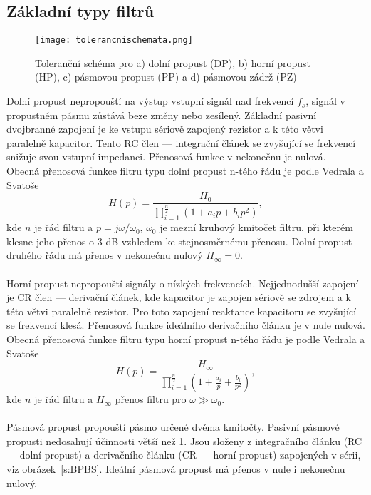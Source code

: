 \subsection{Základní typy filtrů}
\begin{figure}[h]
\centering
\texttt{[image: tolerancnischemata.png]}
\caption[Toleranční schéma dolní propusti (DP), horní propusti (HP), pásmové propusti (PP) a pásmové zádrže (PZ)]{Toleranční schéma pro a) dolní propust (DP), b) horní propust (HP), c) pásmovou propust (PP) a d) pásmovou zádrž (PZ)\cite{7}}
\end{figure}
\noindent Dolní propust nepropouští na výstup vstupní signál nad frekvencí $f_s$, signál v propustném pásmu zůstává beze změny nebo zesílený. Základní pasivní dvojbranné zapojení je ke vstupu sériově zapojený rezistor a k této větvi paralelně kapacitor. Tento RC člen --- integrační článek se zvyšující se frekvencí snižuje svou vstupní impedanci. Přenosová funkce v nekonečnu je nulová. \\
Obecná přenosová funkce filtru typu dolní propust n-tého řádu je podle Vedrala a Svatoše~\cite{8}
\begin{equation}
H(p) = \frac{H_0}{\prod_{i=1}^{\frac{n}{2}} (1 + a_i p + b_i p^2)} \label{r:FTR},
\end{equation}
kde $n$ je řád filtru a $p = j\omega/\omega_0$, $\omega_0$ je mezní kruhový kmitočet filtru, při kterém klesne jeho přenos o 3 dB vzhledem ke stejnosměrnému přenosu.
Dolní propust druhého řádu má přenos v nekonečnu nulový $H_{\infty} = 0$. \\
\\
Horní propust nepropouští signály o nízkých frekvencích. Nejjednodušší zapojení je CR člen --- derivační článek, kde kapacitor je zapojen sériově se zdrojem a k této větvi paralelně rezistor. Pro toto zapojení reaktance kapacitoru se zvyšující se frekvencí klesá. Přenosová funkce ideálního derivačního článku je v nule nulová. \\
Obecná přenosová funkce filtru typu horní propust n-tého řádu je podle Vedrala a Svatoše~\cite{8}
\begin{equation}
H(p) = \frac{H_{\infty}}{\prod_{i=1}^{\frac{n}{2}} (1 + \frac{a_i}{p} + \frac{b_i}{p^2})} \label{r:FTR2},
\end{equation}
kde $n$ je řád filtru a $H_{\infty}$ přenos filtru pro $\omega \gg \omega_0$.\\
\\
\noindent Pásmová propust propouští pásmo určené dvěma kmitočty. Pasivní pásmové propusti nedosahují účinnosti větší než 1. Jsou složeny z integračního článku (RC --- dolní propust) a derivačního článku (CR --- horní propust) zapojených v sérii, viz obrázek~\ref{s:BPBS}. Ideální pásmová propust má přenos v nule i nekonečnu nulový. \\
